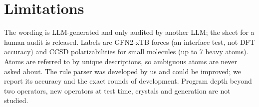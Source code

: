 \documentclass[10pt]{article}
\begin{document}
\section{Limitations}
The wording is LLM-generated and only audited by another LLM; the sheet for a human audit is released. Labels are GFN2-xTB forces
(an interface test, not DFT accuracy) and CCSD polarizabilities for small molecules (up to 7 heavy atoms). Atoms are referred to by
unique descriptions, so ambiguous atoms are never asked about. The rule parser was developed by us and could be improved; we report
its accuracy and the exact rounds of development. Program depth beyond two operators, new operators at test time, crystals and
generation are not studied.



\end{document}
